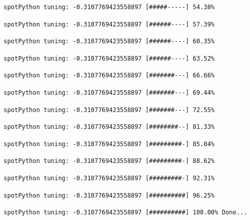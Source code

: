 \documentclass[
  letterpaper,
  DIV=11,
  numbers=noendperiod]{scrreprt}
\begin{document}
\begin{verbatim}
spotPython tuning: -0.3107769423558897 [#####-----] 54.38% 
\end{verbatim}

\begin{verbatim}
spotPython tuning: -0.3107769423558897 [######----] 57.39% 
\end{verbatim}

\begin{verbatim}
spotPython tuning: -0.3107769423558897 [######----] 60.35% 
\end{verbatim}

\begin{verbatim}
spotPython tuning: -0.3107769423558897 [######----] 63.52% 
\end{verbatim}

\begin{verbatim}
spotPython tuning: -0.3107769423558897 [#######---] 66.66% 
\end{verbatim}

\begin{verbatim}
spotPython tuning: -0.3107769423558897 [#######---] 69.44% 
\end{verbatim}

\begin{verbatim}
spotPython tuning: -0.3107769423558897 [#######---] 72.55% 
\end{verbatim}

\begin{verbatim}
spotPython tuning: -0.3107769423558897 [########--] 81.33% 
\end{verbatim}

\begin{verbatim}
spotPython tuning: -0.3107769423558897 [#########-] 85.04% 
\end{verbatim}

\begin{verbatim}
spotPython tuning: -0.3107769423558897 [#########-] 88.62% 
\end{verbatim}

\begin{verbatim}
spotPython tuning: -0.3107769423558897 [#########-] 92.31% 
\end{verbatim}

\begin{verbatim}
spotPython tuning: -0.3107769423558897 [##########] 96.25% 
\end{verbatim}

\begin{verbatim}
spotPython tuning: -0.3107769423558897 [##########] 100.00% Done...
\end{verbatim}
\end{document}
